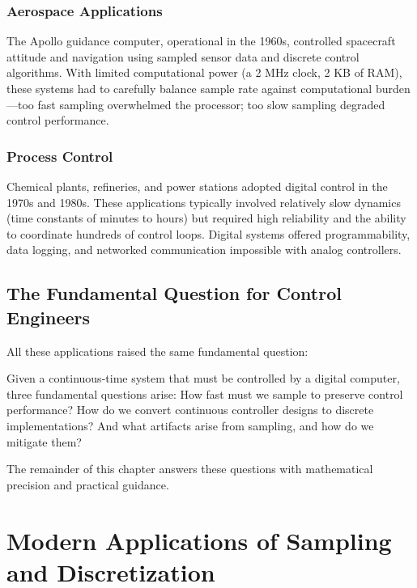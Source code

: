 \subsubsection{Aerospace Applications}

The Apollo guidance computer, operational in the 1960s, controlled spacecraft attitude and navigation using sampled sensor data and discrete control algorithms. With limited computational power (a 2 MHz clock, 2 KB of RAM), these systems had to carefully balance sample rate against computational burden---too fast sampling overwhelmed the processor; too slow sampling degraded control performance.

\subsubsection{Process Control}

Chemical plants, refineries, and power stations adopted digital control in the 1970s and 1980s. These applications typically involved relatively slow dynamics (time constants of minutes to hours) but required high reliability and the ability to coordinate hundreds of control loops. Digital systems offered programmability, data logging, and networked communication impossible with analog controllers.

\subsection{The Fundamental Question for Control Engineers}
\label{subsec:fundamental_question}

All these applications raised the same fundamental question:

\begin{tcolorbox}[colback=yellow!10!white,colframe=orange!75!black,sharp corners,title=The Digital Control Question]
Given a continuous-time system that must be controlled by a digital computer, three fundamental questions arise: How fast must we sample to preserve control performance? How do we convert continuous controller designs to discrete implementations? And what artifacts arise from sampling, and how do we mitigate them?
\end{tcolorbox}

The remainder of this chapter answers these questions with mathematical precision and practical guidance.

\section{Modern Applications of Sampling and Discretization}
\label{sec:modern_applications}

